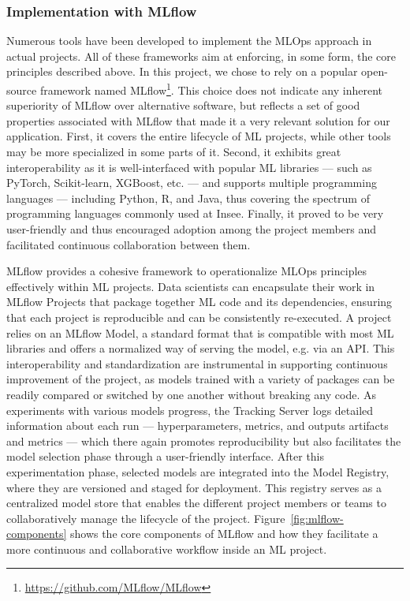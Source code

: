\documentclass[graybox]{svmult}
\begin{document}
\subsubsection{Implementation with MLflow}

Numerous tools have been developed to implement the MLOps approach in actual projects. All of these frameworks aim at enforcing, in some form, the core principles described above. In this project, we chose to rely on a popular open-source framework named MLflow\footnote{\url{https://github.com/MLflow/MLflow}}. This choice does not indicate any inherent superiority of MLflow over alternative software, but reflects a set of good properties associated with MLflow that made it a very relevant solution for our application. First, it covers the entire lifecycle of ML projects, while other tools may be more specialized in some parts of it. Second, it exhibits great interoperability as it is well-interfaced with popular ML libraries — such as PyTorch, Scikit-learn, XGBoost, etc. — and supports multiple programming languages — including Python, R, and Java, thus covering the spectrum of programming languages commonly used at Insee. Finally, it proved to be very user-friendly and thus encouraged adoption among the project members and facilitated continuous collaboration between them.

MLflow provides a cohesive framework to operationalize MLOps principles effectively within ML projects. Data scientists can encapsulate their work in MLflow Projects that package together ML code and its dependencies, ensuring that each project is reproducible and can be consistently re-executed. A project relies on an MLflow Model, a standard format that is compatible with most ML libraries and offers a normalized way of serving the model, e.g. via an API. This interoperability and standardization are instrumental in supporting continuous improvement of the project, as models trained with a variety of packages can be readily compared or switched by one another without breaking any code. As experiments with various models progress, the Tracking Server logs detailed information about each run — hyperparameters, metrics, and outputs artifacts and metrics — which there again promotes reproducibility but also facilitates the model selection phase through a user-friendly interface. After this experimentation phase, selected models are integrated into the Model Registry, where they are versioned and staged for deployment. This registry serves as a centralized model store that enables the different project members or teams to collaboratively manage the lifecycle of the project. Figure~\ref{fig:mlflow-components} shows the core components of MLflow and how they facilitate a more continuous and collaborative workflow inside an ML project.
\end{document}
